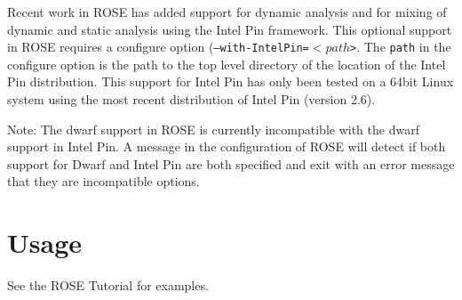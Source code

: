    Recent work in ROSE has added support for dynamic analysis and for mixing of dynamic
and static analysis using the Intel Pin framework. This optional support in ROSE
requires a configure option ({\tt --with-IntelPin=$<path$>}.  The {\tt path} in
the configure option is the path to the top level directory of the location of
the Intel Pin distribution.  This support for Intel Pin has only been tested
on a 64bit Linux system using the most recent distribution of Intel Pin (version 2.6).

Note: The dwarf support in ROSE is currently incompatible with the dwarf support in
Intel Pin.  A message in the configuration of ROSE will detect if both support for
Dwarf and Intel Pin are both specified and exit with an error message that they
are incompatible options.


\section{Usage}
     See the ROSE Tutorial for examples.



